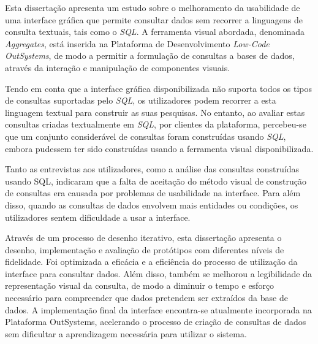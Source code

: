 Esta dissertação apresenta um estudo sobre o melhoramento da usabilidade de uma interface gráfica que permite consultar dados sem recorrer a linguagens de consulta textuais, tais como o \textit{SQL}. A ferramenta visual abordada, denominada \textit{Aggregates}, está inserida na Plataforma de Desenvolvimento \textit{Low-Code} \textit{OutSystems}, de modo a permitir a formulação de consultas a bases de dados, através da interação e manipulação de componentes visuais.

Tendo em conta que a interface gráfica disponibilizada não suporta todos os tipos de consultas suportadas pelo \textit{SQL}, os utilizadores podem recorrer a esta linguagem textual para construir as suas pesquisas. No entanto, ao avaliar estas consultas criadas textualmente em \textit{SQL}, por clientes da plataforma, percebeu-se que um conjunto considerável de consultas foram construídas usando \textit{SQL}, embora pudessem ter sido construídas usando a ferramenta visual disponibilizada.

Tanto as entrevistas aos utilizadores, como a análise das consultas construídas usando SQL, indicaram que a falta de aceitação do método visual de construção de consultas era causada por problemas de usabilidade na interface. Para além disso, quando as consultas de dados envolvem mais entidades ou condições, os utilizadores sentem dificuldade a usar a interface.

Através de um processo de desenho iterativo, esta dissertação apresenta o desenho, implementação e avaliação de protótipos com diferentes níveis de fidelidade. Foi optimizada a eficácia e a eficiência do processo de utilização da interface para consultar dados. Além disso, também se melhorou a legibilidade da representação visual da consulta, de modo a diminuir o tempo e esforço necessário para compreender que dados pretendem ser extraídos da base de dados. A implementação final da interface encontra-se atualmente incorporada na Plataforma OutSystems, acelerando o processo de criação de consultas de dados sem dificultar a aprendizagem necessária para utilizar o sistema.


